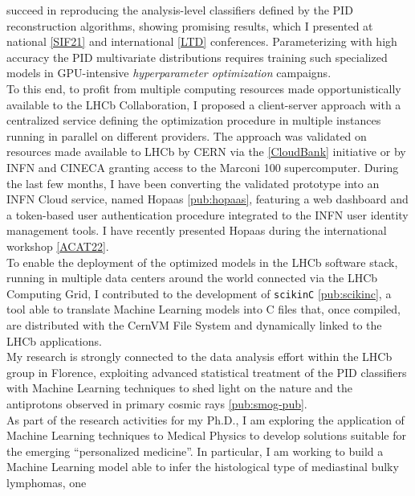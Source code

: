 \begin{cvcontent}
  succeed in reproducing the analysis-level classifiers defined 
  by the PID reconstruction algorithms, showing promising results,
  which I presented at national \hyperlink{sif-2021}{[SIF21]} 
  and international \hyperlink{ltd}{[LTD]} conferences. 
  Parameterizing with high accuracy the PID multivariate 
  distributions requires training such specialized models
  in GPU-intensive \emph{hyperparameter optimization} campaigns.
  \\
  To this end, to profit from multiple computing resources made 
  opportunistically available to the LHCb Collaboration, I proposed 
  a client-server approach with a centralized service defining the 
  optimization procedure in multiple instances running in parallel 
  on different providers. The approach was validated on resources made 
  available to LHCb by CERN via the \hyperlink{cloud-bank}{[CloudBank]} 
  initiative or by INFN and CINECA granting access to the Marconi 100 
  supercomputer. During the last few months, I have been converting the 
  validated prototype into an INFN Cloud service, named Hopaas 
  \ref{pub:hopaas}, featuring a web dashboard and a token-based user 
  authentication procedure integrated to the INFN user identity management 
  tools. I have recently presented Hopaas during the international 
  workshop \hyperlink{acat-2022}{[ACAT22]}.
  \\ [2mm]
  To enable the deployment of the optimized models in the LHCb software 
  stack, running in multiple data centers around the world connected 
  via the LHCb Computing Grid, I contributed to the development of 
  \texttt{scikinC} \ref{pub:scikinc}, a tool able to translate 
  Machine Learning models into C files that, once compiled, 
  are distributed with the CernVM File System and dynamically 
  linked to the LHCb applications.
  \\ [2mm]
  My research is strongly connected to the data analysis effort within 
  the LHCb group in Florence, exploiting advanced statistical treatment 
  of the PID classifiers with Machine Learning techniques to shed light 
  on the nature and the antiprotons observed in primary cosmic rays 
  \ref{pub:smog-pub}.
  \\ [2mm]
  As part of the research activities for my Ph.D., I am exploring the 
  application of Machine Learning techniques to Medical Physics to 
  develop solutions suitable for the emerging ``personalized medicine''. 
  In particular, I am working to build a Machine Learning model able 
  to infer the histological type of mediastinal bulky lymphomas, one 

\end{cvcontent}
